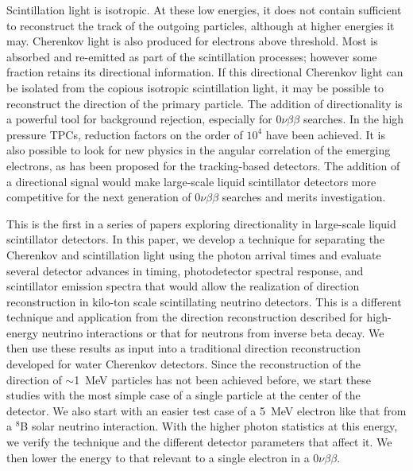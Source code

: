 \documentclass[cits]{JINST}
\begin{document}
Scintillation light is isotropic. At these low energies, it does not contain sufficient to reconstruct the track of the outgoing particles, although at higher energies it may\cite{john}.  Cherenkov light is also
produced for electrons above threshold. Most is absorbed and re-emitted as part of the
scintillation processes; however some fraction retains its
directional information. If this directional Cherenkov light can be
isolated from the copious isotropic scintillation light, it may be
possible to reconstruct the direction of the primary particle. The addition of directionality is a powerful tool
for background rejection, especially for $0\nu\beta\beta$ searches. In the high pressure TPCs, reduction factors on the order of $10^4$ have been achieved\cite{Gotthard}. It is also possible to look for new physics in the angular correlation of the emerging electrons\cite{newphysics0nuBB}, as has been proposed for the tracking-based detectors\cite{SuperNEMO}. The addition of a directional signal would make large-scale liquid scintillator detectors more competitive for the next generation of $0\nu\beta\beta$ searches and merits investigation.

This is the first in a series of papers exploring directionality in large-scale liquid scintillator detectors. In this paper, we develop a technique for
separating the Cherenkov and scintillation light using the photon arrival
times and evaluate several detector advances in timing, photodetector 
spectral response, and scintillator emission spectra that would allow
the realization of direction reconstruction in kilo-ton scale
scintillating neutrino detectors. This is a different technique and application from the direction reconstruction described for high-energy neutrino interactions\cite{john} or that for neutrons from inverse beta decay\cite{chooz,dcDirection}.  We then use these results as input into a traditional direction reconstruction developed for water Cherenkov detectors. Since the reconstruction of the direction of $\sim$1~MeV particles has not been achieved before, we start these studies with the most simple case of a single particle at the center of the detector. We also start with an easier test case of a 5~MeV electron like that from a $^{8}$B solar neutrino interaction. With the higher photon statistics at this energy, we verify the technique and the different detector parameters that affect it. We then lower the energy to that relevant to a single electron in a $0\nu\beta\beta$.  
\end{document}
